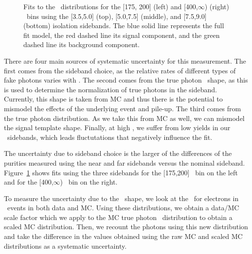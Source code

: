 \begin{figure}[htbp]
{  }
  \caption{
    Fits to the \sieie\ distributions for the [175, 200] (left) and [400,$\infty$) (right) \pt\ bins using the [3.5,5.0] (top), [5.0,7.5] (middle), and [7.5,9.0] (bottom) isolation sidebands.
      The blue solid line represents the full fit model, the red dashed line its signal component, and the green dashed line its background component.
    }
    \label{fig:impurity-sideband}
\end{figure}

There are four main sources of systematic uncertainty for this measurement. 
The first comes from the sideband choice, as the relative rates of different types of fake photons varies with \ICH. 
The second comes from the true photon \ICH\ shape, as this is used to determine the normalization of true photons in the sideband. 
Currently, this shape is taken from MC and thus there is the potential to mismodel the effects of the underlying event and pile-up. 
The third comes from the true photon \sieie distribution. 
As we take this from MC as well, we can mismodel the signal template shape. 
Finally, at high \pt, we suffer from low yields in our \ICH\ sidebands, which leads fluctutations that negatively influence the fit.

The uncertainty due to sideband choice is the larger of the differences of the purities measured using the near and far sidebands versus the nominal sideband. 
Figure~\ref{fig:impurity-sideband} shows fits using the three sidebands for the [175,200] \pt\ bin on the left and for the [400,$\infty$) \pt\ bin on the right.

To measure the uncertainty due to the \ICH\ shape, we look at the \ICH\ for electrons in \Zee\ events in both data and MC. 
Using these distributions, we obtain a data/MC scale factor which we apply to the MC true photon \ICH\ distribution to obtain a scaled MC distribution. 
Then, we recount the photons using this new distribution and take the difference in the values obtained using the raw MC and scaled MC distributions as a systematic uncertainty.

